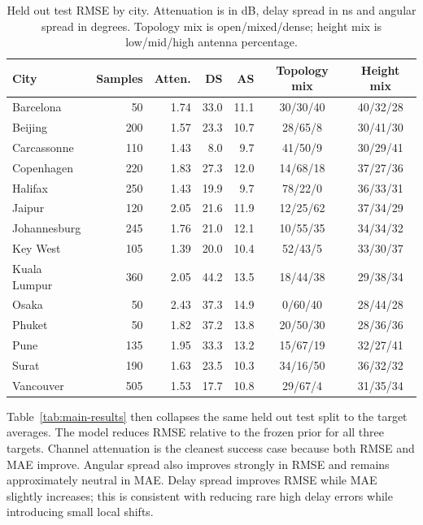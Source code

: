 \documentclass[journal]{IEEEtran}
\begin{document}
\begin{table}[!t]
\centering
\caption{Held out test RMSE by city. Attenuation is in dB, delay spread in ns
and angular spread in degrees. Topology mix is open/mixed/dense; height mix is
low/mid/high antenna percentage.}
\label{tab:test-city-audit}
\scriptsize
\setlength{\tabcolsep}{3pt}
\begin{tabularx}{\textwidth}{>{\raggedright\arraybackslash}Xrrrrcc}
\toprule
City & Samples & Atten. & DS & AS & Topology mix & Height mix \\
\midrule
Barcelona & 50 & 1.74 & 33.0 & 11.1 & 30/30/40 & 40/32/28 \\
Beijing & 200 & 1.57 & 23.3 & 10.7 & 28/65/8 & 30/41/30 \\
Carcassonne & 110 & 1.43 & 8.0 & 9.7 & 41/50/9 & 30/29/41 \\
Copenhagen & 220 & 1.83 & 27.3 & 12.0 & 14/68/18 & 37/27/36 \\
Halifax & 250 & 1.43 & 19.9 & 9.7 & 78/22/0 & 36/33/31 \\
Jaipur & 120 & 2.05 & 21.6 & 11.9 & 12/25/62 & 37/34/29 \\
Johannesburg & 245 & 1.76 & 21.0 & 12.1 & 10/55/35 & 34/34/32 \\
Key West & 105 & 1.39 & 20.0 & 10.4 & 52/43/5 & 33/30/37 \\
Kuala Lumpur & 360 & 2.05 & 44.2 & 13.5 & 18/44/38 & 29/38/34 \\
Osaka & 50 & 2.43 & 37.3 & 14.9 & 0/60/40 & 28/44/28 \\
Phuket & 50 & 1.82 & 37.2 & 13.8 & 20/50/30 & 28/36/36 \\
Pune & 135 & 1.95 & 33.3 & 13.2 & 15/67/19 & 32/27/41 \\
Surat & 190 & 1.63 & 23.5 & 10.3 & 34/16/50 & 36/32/32 \\
Vancouver & 505 & 1.53 & 17.7 & 10.8 & 29/67/4 & 31/35/34 \\
\bottomrule
\end{tabularx}
\end{table}

Table~\ref{tab:main-results} then collapses the same held out test split to the
target averages. The model reduces RMSE relative to the frozen prior for all
three targets. Channel attenuation is the cleanest success case because both
RMSE and MAE improve. Angular spread also improves strongly in RMSE and remains
approximately neutral in MAE. Delay spread improves RMSE while MAE slightly
increases; this is consistent with reducing rare high delay errors while
introducing small local shifts.
\end{document}
